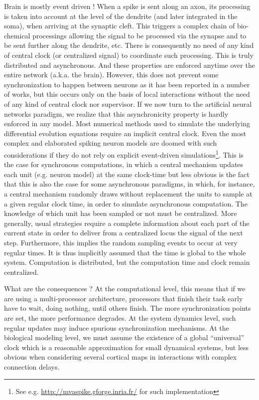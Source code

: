 Brain is mostly event driven ! When a spike is sent along an axon, its processing is taken into account at the level of the dendrite (and later integrated in the soma), when arriving at the synaptic cleft. This triggers a complex chain of bio-chemical processings allowing the signal to be processed via the synapse and to be sent further along the dendrite, etc. There is consequently no need of any kind of central clock (or centralized signal) to coordinate such processing. This is truly distributed and asynchronous. And these properties are enforced anytime over the entire network (a.k.a. the brain). However, this does not prevent some synchronization to happen between neurons as it has been reported in a number of works, but this occurs only on the basis of local interactions without the need of any kind of central clock nor supervisor. If we now turn to the artificial neural networks paradigm, we realize that this asynchronicity property is hardly enforced in any model. Most numerical methods used to simulate the underlying differential evolution equations require an implicit central clock. Even the most complex and elaborated spiking neuron models are doomed with such considerations if they do not rely on explicit event-driven simulations\footnote{See e.g. \url{http://mvaspike.gforge.inria.fr/} for such implementation}. This is the case for synchronous computations, in which a central mechanism updates each unit (e.g. neuron model) at the same clock-time but less obvious is the fact that this is also the case for some asynchronous paradigms, in which, for instance, a central mechanism randomly draws without replacement the units to sample at a given regular clock time, in order to simulate asynchronous computation. The knowledge of which unit has been sampled or not must be centralized. More generally, usual strategies require a complete information about each part of the current state in order to deliver from a centralized locus the signal of the next step. Furthermore, this implies the random sampling events to occur at very regular times. It is thus implicitly assumed that the time is global to the whole system. Computation is distributed, but the computation time and clock remain centralized.

What are the consequences ? At the computational level, this means that if we are using a multi-processor architecture, processors that finish their task early have to wait, doing nothing, until others finish. The more synchronization points are set, the more performance degrades.  At the system dynamics level, such regular updates may induce spurious synchronization mechanisms.  At the biological modeling level, we must assume the existence of a global ``universal'' clock which is a reasonable approximation for small dynamical systems, but less obvious when considering several cortical maps in interactions with complex connection delays.

